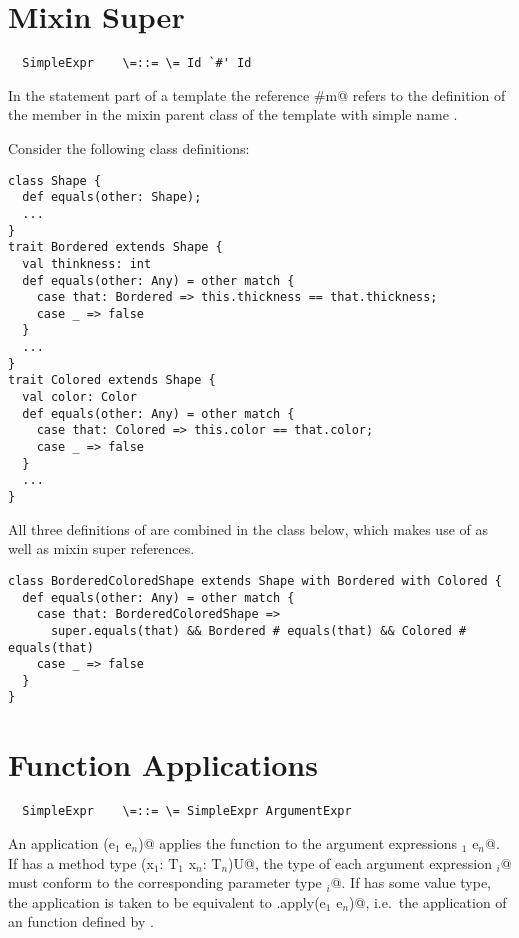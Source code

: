 \documentclass[11pt]{report}
\begin{document}
\section{Mixin Super}
\label{sec:this-mxin-super}

\syntax\begin{verbatim}
  SimpleExpr    \=::= \= Id `#' Id
\end{verbatim}

In the statement part of a template
the reference \verb@M#m@ refers to the definition of the member \verb@m@ in
the mixin parent class of the template with simple name \verb@M@.

\example Consider the following class definitions:
\begin{verbatim}
class Shape {
  def equals(other: Shape);
  ...
}
trait Bordered extends Shape {
  val thinkness: int
  def equals(other: Any) = other match {
    case that: Bordered => this.thickness == that.thickness;
    case _ => false
  }
  ...
}
trait Colored extends Shape {
  val color: Color
  def equals(other: Any) = other match {
    case that: Colored => this.color == that.color;
    case _ => false
  }
  ...
}
\end{verbatim}

All three definitions of \verb@equals@ are combined in the class
below, which makes use of \verb@super@ as well as mixin
super references.
\begin{verbatim}
class BorderedColoredShape extends Shape with Bordered with Colored {
  def equals(other: Any) = other match {
    case that: BorderedColoredShape => 
      super.equals(that) && Bordered # equals(that) && Colored # equals(that)
    case _ => false
  }
}
\end{verbatim}

\section{Function Applications}
\label{sec:apply}

\syntax\begin{verbatim}
  SimpleExpr    \=::= \= SimpleExpr ArgumentExpr
\end{verbatim}

An application \verb@f(e$_1$ \commadots e$_n$)@ applies the function \verb@f@ to the
argument expressions \verb@e$_1$ \commadots e$_n$@. If \verb@f@ has a method type
\verb@(x$_1$: T$_1$ \commadots x$_n$: T$_n$)U@, the type of each argument
expression \verb@e$_i$@ must conform to the corresponding parameter type
\verb@T$_i$@. If \verb@f@ has some value type, the application is taken to be
equivalent to \verb@f.apply(e$_1$ \commadots e$_n$)@, i.e.\ the
application of an \verb@apply@ function defined by \verb@f@.
\end{document}
